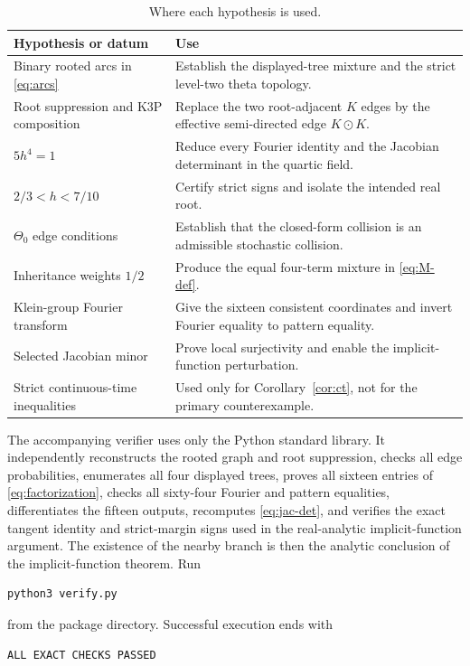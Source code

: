 \documentclass[11pt]{article}
\theoremstyle{remark}
\newcommand{\ThetaZero}{\Theta_{0}}
\newcommand{\odotv}{\mathbin{\odot}}
\begin{document}
\begin{table}[ht]
\centering
\caption{Where each hypothesis is used.}
\label{tab:hypotheses}
\begin{tabularx}{\textwidth}{@{}lX@{}}
\toprule
Hypothesis or datum & Use\\
\midrule
Binary rooted arcs in \eqref{eq:arcs} & Establish the displayed-tree mixture and the strict level-two theta topology.\\
Root suppression and K3P composition & Replace the two root-adjacent $K$ edges by the effective semi-directed edge $K\odotv K$.\\
$5h^4=1$ & Reduce every Fourier identity and the Jacobian determinant in the quartic field.\\
$2/3<h<7/10$ & Certify strict signs and isolate the intended real root.\\
$\ThetaZero$ edge conditions & Establish that the closed-form collision is an admissible stochastic collision.\\
Inheritance weights $1/2$ & Produce the equal four-term mixture in \eqref{eq:M-def}.\\
Klein-group Fourier transform & Give the sixteen consistent coordinates and invert Fourier equality to pattern equality.\\
Selected Jacobian minor & Prove local surjectivity and enable the implicit-function perturbation.\\
Strict continuous-time inequalities & Used only for Corollary~\ref{cor:ct}, not for the primary counterexample.\\
\bottomrule
\end{tabularx}
\end{table}

The accompanying verifier uses only the Python standard library.  It independently reconstructs the rooted graph and root suppression, checks all edge probabilities, enumerates all four displayed trees, proves all sixteen entries of \eqref{eq:factorization}, checks all sixty-four Fourier and pattern equalities, differentiates the fifteen outputs, recomputes \eqref{eq:jac-det}, and verifies the exact tangent identity and strict-margin signs used in the real-analytic implicit-function argument.  The existence of the nearby branch is then the analytic conclusion of the implicit-function theorem.  Run
\begin{verbatim}
python3 verify.py
\end{verbatim}
from the package directory.  Successful execution ends with
\begin{verbatim}
ALL EXACT CHECKS PASSED
\end{verbatim}
\end{document}

